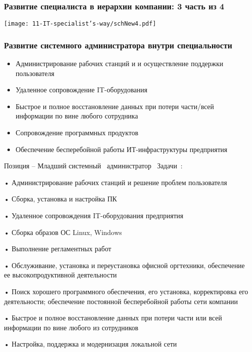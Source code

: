 \documentclass{../industrial-development}
\begin{document}
\begin{frame} \frametitle{Развитие  специалиста в иерархии компании: 3 часть из 4 }
  \centerline{\texttt{[image: 11-IT-specialist's-way/schNew4.pdf]}}
\end{frame}


\begin{frame} \frametitle{Развитие системного администратора внутри специальности}
  \begin{itemize}
  \item  Администрирование рабочих станций и и осуществление поддержки пользователя
  \item  Удаленное сопровождение IT-оборудования
  \item  Быстрое и полное восстановление данных при потери части/всей информации по вине любого сотрудника
 \item   Сопровождение программных продуктов
 \item   Обеспечение бесперебойной работы ИТ-инфраструктуры предприятия
  \end{itemize}
\end{frame}

\lecturenotes

Позиция – Младший системный~\cite{hh} администратор~\cite{itcf}
Задачи~\cite{rab}:

•	Администрирование рабочих станций и решение проблем пользователя

•	Сборка, установка и настройка ПК

•	Удаленное сопровождения IT-оборудования предприятия

•	Сборка образов ОС Linux, Windows

•	Выполнение регламентных работ

•	Обслуживание, установка и переустановка офисной оргтехники, обеспечение ее высокопродуктивной деятельности

•	Поиск хорошего программного обеспечения, его установка, корректировка его деятельности; обеспечение постоянной бесперебойной работы сети компании

•	Быстрое и полное восстановление данных при потери части или всей информации по вине любого из сотрудников

•	Настройка, поддержка и модернизация локальной сети
\end{document}
